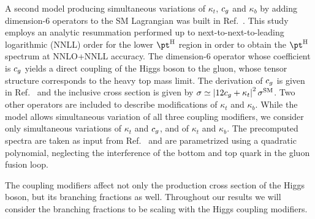 A second model producing simultaneous variations of $\kappa_t$, $c_g$ and $\kappa_b$ by adding dimension-6 operators to the SM Lagrangian was built in Ref.~\cite{Grazzini:2017szg}.
% 
This study employs an analytic resummation performed up to next-to-next-to-leading logarithmic (NNLL) order for the lower $\pth$ region in order to obtain the $\pth$ spectrum at NNLO+NNLL accuracy.
% 
The dimension-6 operator whose coefficient is $c_g$ yields a direct coupling of the Higgs boson to the gluon, whose tensor structure corresponds to the heavy top mass limit.
% 
The derivation of $c_g$ is given in Ref.~\cite{Grazzini:2017szg} and the inclusive cross section is given by $\sigma \simeq \left| 12c_g + \kappa_t \right|^2 \sigma^\text{SM}$.
% 
% 
Two other operators are included to describe modifications of $\kappa_t$ and $\kappa_b$.
% 
While the model allows simultaneous variation of all three coupling modifiers, we consider only simultaneous variations of $\kappa_t$ and $c_g$, and of $\kappa_t$ and $\kappa_b$.
% 
The precomputed spectra are taken as input from Ref.~\cite{Grazzini:2017szg} and are parametrized using a quadratic polynomial, neglecting the interference of the bottom and top quark in the gluon fusion loop.
% 




The coupling modifiers affect not only the production cross section of the Higgs boson, but its branching fractions as well.
% 
Throughout our results we will consider the branching fractions to be scaling with the Higgs coupling modifiers.

